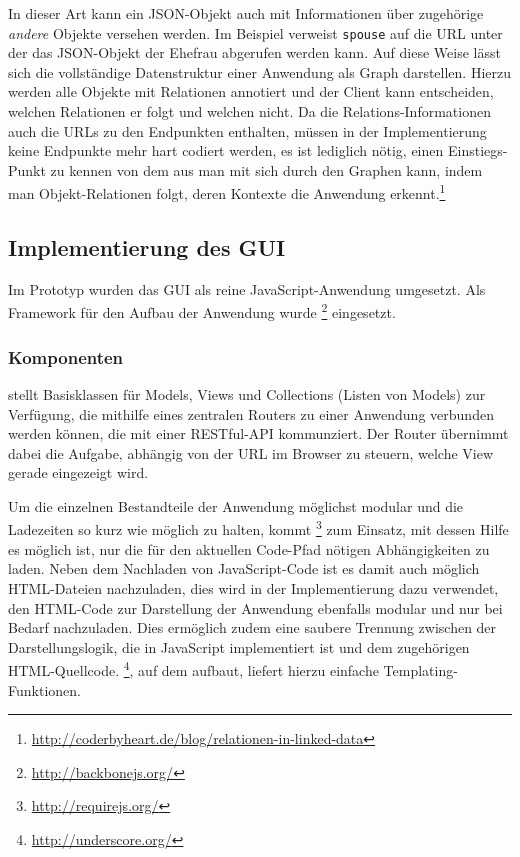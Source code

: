 In dieser Art kann ein JSON-Objekt auch mit Informationen über zugehörige \emph{andere} Objekte versehen werden. Im Beispiel verweist \texttt{spouse} auf die URL unter der das JSON-Objekt der Ehefrau abgerufen werden kann. Auf diese Weise lässt sich die vollständige Datenstruktur einer Anwendung als Graph darstellen. Hierzu werden alle Objekte mit Relationen annotiert und der Client kann entscheiden, welchen Relationen er folgt und welchen nicht. Da die Relations-Informationen auch die URLs zu den Endpunkten enthalten, müssen in der Implementierung keine Endpunkte mehr hart codiert werden, es ist lediglich nötig, einen Einstiegs-Punkt zu kennen von dem aus man mit sich durch den Graphen  kann, indem man Objekt-Relationen folgt, deren Kontexte die Anwendung erkennt.\footnote{\url{http://coderbyheart.de/blog/relationen-in-linked-data}}

\pagebreak

\subsection{Implementierung des GUI}\label{l:implementierung-gui}

Im Prototyp wurden das GUI als reine JavaScript-Anwendung umgesetzt. Als Framework für den Aufbau der Anwendung wurde \footnote{\url{http://backbonejs.org/}} eingesetzt. 

\subsubsection{Komponenten}

 stellt Basisklassen für Models, Views und Collections (Listen von Models) zur Verfügung, die mithilfe eines zentralen Routers zu einer Anwendung verbunden werden können, die mit einer RESTful-API kommunziert. Der Router übernimmt dabei die Aufgabe, abhängig von der URL im Browser zu steuern, welche View gerade eingezeigt wird. 

Um die einzelnen Bestandteile der Anwendung möglichst modular und die Ladezeiten so kurz wie möglich zu halten, kommt \footnote{\url{http://requirejs.org/}} zum Einsatz, mit dessen Hilfe es möglich ist, nur die für den aktuellen Code-Pfad nötigen Abhängigkeiten zu laden. Neben dem Nachladen von Ja\-va\-Scr\-ipt-Code ist es damit auch möglich HTML-Dateien nachzuladen, dies wird in der Implementierung dazu verwendet, den HTML-Code zur Darstellung der Anwendung ebenfalls modular und nur bei Bedarf nachzuladen. Dies ermöglich zudem eine saubere Trennung zwischen der Darstellungslogik, die in JavaScript implementiert ist und dem zugehörigen HTML-Quellcode. \footnote{\url{http://underscore.org/}}, auf dem  aufbaut, liefert hierzu einfache Templating-Funktionen.

